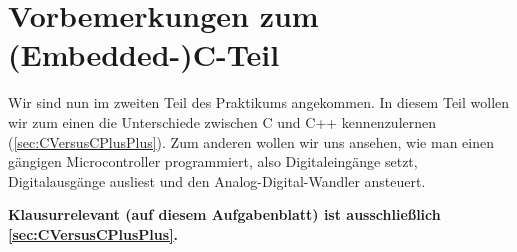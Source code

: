 \section*{\ExercisePrefixEmbeddedC Vorbemerkungen zum (Embedded-)C-Teil}

Wir sind nun im zweiten Teil des Praktikums angekommen.
In diesem Teil wollen wir zum einen die Unterschiede zwischen C und C++ kennenzulernen (\ref{sec:CVersusCPlusPlus}).
Zum anderen wollen wir uns ansehen, wie man einen gängigen Microcontroller programmiert, also Digitaleingänge setzt, Digitalausgänge ausliest und den Analog-Digital-Wandler ansteuert.

\textbf{Klausurrelevant (auf diesem Aufgabenblatt) ist ausschließlich \ref{sec:CVersusCPlusPlus}.}